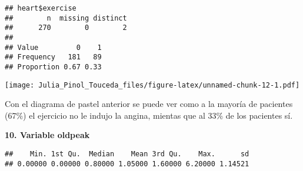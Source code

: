 \documentclass[]{article}
\newenvironment{Shaded}{\begin{snugshade}}{\end{snugshade}}
\newcommand{\KeywordTok}[1]{\textcolor[rgb]{0.13,0.29,0.53}{\textbf{#1}}}
\newcommand{\DataTypeTok}[1]{\textcolor[rgb]{0.13,0.29,0.53}{#1}}
\newcommand{\DecValTok}[1]{\textcolor[rgb]{0.00,0.00,0.81}{#1}}
\newcommand{\StringTok}[1]{\textcolor[rgb]{0.31,0.60,0.02}{#1}}
\newcommand{\OperatorTok}[1]{\textcolor[rgb]{0.81,0.36,0.00}{\textbf{#1}}}
\newcommand{\NormalTok}[1]{#1}
\begin{document}
\begin{Shaded}
\end{Shaded}

\begin{verbatim}
## heart$exercise 
##        n  missing distinct 
##      270        0        2 
##                     
## Value         0    1
## Frequency   181   89
## Proportion 0.67 0.33
\end{verbatim}

\begin{Shaded}
\end{Shaded}

\texttt{[image: Julia\_Pinol\_Touceda\_files/figure-latex/unnamed-chunk-12-1.pdf]}

Con el diagrama de pastel anterior se puede ver como a la mayoría de
pacientes (67\%) el ejercicio no le indujo la angina, mientas que al
33\% de los pacientes sí.

\textbf{10. Variable oldpeak}

\begin{Shaded}
\end{Shaded}

\begin{verbatim}
##    Min. 1st Qu.  Median    Mean 3rd Qu.    Max.      sd 
## 0.00000 0.00000 0.80000 1.05000 1.60000 6.20000 1.14521
\end{verbatim}
\end{document}
